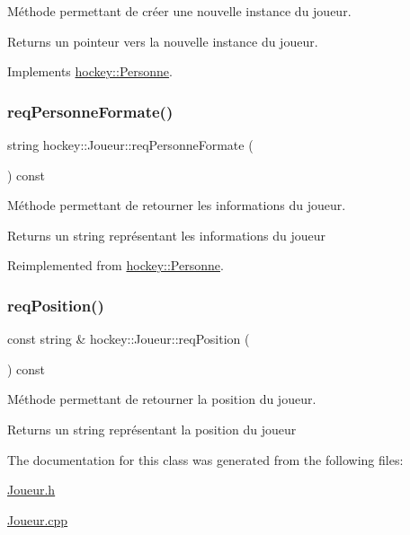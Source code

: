 Méthode permettant de créer une nouvelle instance du joueur. 

\begin{DoxyReturn}{Returns}
un pointeur vers la nouvelle instance du joueur. 
\end{DoxyReturn}


Implements \hyperlink{classhockey_1_1Personne}{hockey\+::\+Personne}.

\mbox{\label{classhockey_1_1Joueur_ab3d6b15e55aa765807e4960108f7db29}} 
\subsubsection{\texorpdfstring{req\+Personne\+Formate()}{reqPersonneFormate()}}
{\footnotesize\ttfamily string hockey\+::\+Joueur\+::req\+Personne\+Formate (\begin{DoxyParamCaption}{ }\end{DoxyParamCaption}) const\hspace{0.3cm}{\ttfamily [virtual]}}



Méthode permettant de retourner les informations du joueur. 

\begin{DoxyReturn}{Returns}
un string représentant les informations du joueur 
\end{DoxyReturn}


Reimplemented from \hyperlink{classhockey_1_1Personne_ae67b3d253c1fa8a090dd8040ca1e8ccc}{hockey\+::\+Personne}.

\mbox{\label{classhockey_1_1Joueur_a7c9bc7262096861271b4e0431dcd1693}} 
\subsubsection{\texorpdfstring{req\+Position()}{reqPosition()}}
{\footnotesize\ttfamily const string \& hockey\+::\+Joueur\+::req\+Position (\begin{DoxyParamCaption}{ }\end{DoxyParamCaption}) const}



Méthode permettant de retourner la position du joueur. 

\begin{DoxyReturn}{Returns}
un string représentant la position du joueur 
\end{DoxyReturn}


The documentation for this class was generated from the following files\+:\begin{DoxyCompactItemize}
\item 
\hyperlink{Joueur_8h}{Joueur.\+h}\item 
\hyperlink{Joueur_8cpp}{Joueur.\+cpp}\end{DoxyCompactItemize}
